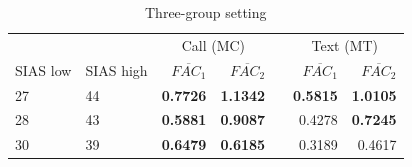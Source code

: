 \begin{table}
\begin{center}
\begin{subtable}{.8\textwidth}
\begin{tabular}{ l l @{\hskip 0.5in} r r r r r}
    \toprule
    				&				& \multicolumn{2}{c}{Call (MC)} 						&	& \multicolumn{2}{c}{Text (MT)} \\
                    				\cline{3-4}										\cline{6-7}
    	SIAS low	& SIAS high		& $\overline{FAC_1}$			&$\overline{FAC_2}$			&	& $\overline{FAC_1}$ 	& $\overline{FAC_2}$		 \\
        \hline
        27			& 44			& \textbf{0.7726}				& \textbf{1.1342}				&	& \textbf{0.5815}				& \textbf{1.0105}			\\
       28			& 43			& \textbf{0.5881}				& \textbf{0.9087}				&	& 0.4278				& \textbf{0.7245}			\\
        30			& 39			& \textbf{0.6479}				& \textbf{0.6185}				&	& 0.3189				& 0.4617			\\
	\bottomrule
    \end{tabular}
    \caption{Three-group setting\label{three-group}}
    \end{subtable}
\end{center}
\end{table}



